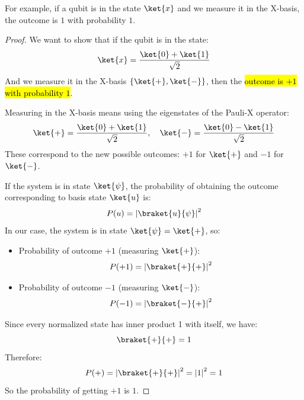 \highspace
\begin{examplebox}
   For example, if a qubit is in the state $\ket{x}$ and we measure it in the X-basis, the outcome is $1$ with probability $1$.
   \begin{proof}
      We want to show that if the qubit is in the state:
      \begin{equation*}
         \ket{x} = \dfrac{\ket{0} + \ket{1}}{\sqrt{2}}
      \end{equation*}
      And we measure it in the X-basis $\left\{ \ket{+}, \ket{-} \right\}$, then the \hl{outcome is $+1$ with probability $1$}.

      Measuring in the X-basis means using the eigenstates of the Pauli-X operator:
      \begin{equation*}
         \ket{+} = \dfrac{\ket{0} + \ket{1}}{\sqrt{2}}, \quad \ket{-} = \dfrac{\ket{0} - \ket{1}}{\sqrt{2}}
      \end{equation*}
      These correspond to the new possible outcomes: $+1$ for $\ket{+}$ and $-1$ for $\ket{-}$.

      If the system is in state $\ket{\psi}$, the probability of obtaining the outcome corresponding to basis state $\ket{u}$ is:
      \begin{equation*}
         P(u) = \left|\braket{u}{\psi}\right|^{2}
      \end{equation*}
      In our case, the system is in state $\ket{\psi} = \ket{+}$, so:
      \begin{itemize}
         \item Probability of outcome $+1$ (measuring $\ket{+}$):
         \begin{equation*}
            P(+1) = \left|\braket{+}{+}\right|^{2}
         \end{equation*}
         \item Probability of outcome $-1$ (measuring $\ket{-}$):
         \begin{equation*}
            P(-1) = \left|\braket{-}{+}\right|^{2}
         \end{equation*}
      \end{itemize}
      Since every normalized state has inner product 1 with itself, we have:
      \begin{equation*}
         \braket{+}{+} = 1
      \end{equation*}
      Therefore:
      \begin{equation*}
         P(+) = \left|\braket{+}{+}\right|^{2} = \left|1\right|^{2} = 1
      \end{equation*}
      So the probability of getting $+1$ is $1$.


\end{proof}
\end{examplebox}
